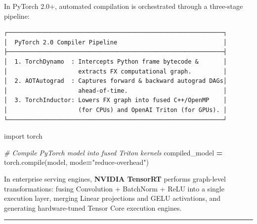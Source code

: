 \documentclass[
  letterpaper,
]{scrbook}
\newenvironment{Shaded}{\begin{snugshade}}{\end{snugshade}}
\newcommand{\BuiltInTok}[1]{#1}
\newcommand{\CommentTok}[1]{\textcolor[rgb]{0.56,0.35,0.01}{\textit{#1}}}
\newcommand{\ImportTok}[1]{#1}
\newcommand{\NormalTok}[1]{#1}
\newcommand{\OperatorTok}[1]{\textcolor[rgb]{0.81,0.36,0.00}{\textbf{#1}}}
\newcommand{\StringTok}[1]{\textcolor[rgb]{0.31,0.60,0.02}{#1}}
\begin{document}
\begin{tcolorbox}[enhanced jigsaw, arc=.35mm, bottomrule=.15mm, bottomtitle=1mm, breakable, colback=white, colbacktitle=quarto-callout-note-color!10!white, colframe=quarto-callout-note-color-frame, coltitle=black, left=2mm, leftrule=.75mm, opacityback=0, opacitybacktitle=0.6, rightrule=.15mm, title=\textcolor{quarto-callout-note-color}{\faInfo}\hspace{0.5em}{PyTorch Systems Bridge: \texttt{torch.compile}, TorchInductor, and
TensorRT}, titlerule=0mm, toprule=.15mm, toptitle=1mm]

In PyTorch 2.0+, automated compilation is orchestrated through a
three-stage pipeline:

\begin{verbatim}
┌─────────────────────────────────────────────────────────────┐
│  PyTorch 2.0 Compiler Pipeline                              │
├─────────────────────────────────────────────────────────────┤
│  1. TorchDynamo  : Intercepts Python frame bytecode &       │
│                    extracts FX computational graph.         │
│  2. AOTAutograd  : Captures forward & backward autograd DAGs│
│                    ahead-of-time.                           │
│  3. TorchInductor: Lowers FX graph into fused C++/OpenMP    │
│                    (for CPUs) and OpenAI Triton (for GPUs). │
└─────────────────────────────────────────────────────────────┘
\end{verbatim}

\begin{Shaded}
\begin{Highlighting}[]
\ImportTok{import}\NormalTok{ torch}

\CommentTok{\# Compile PyTorch model into fused Triton kernels}
\NormalTok{compiled\_model }\OperatorTok{=}\NormalTok{ torch.}\BuiltInTok{compile}\NormalTok{(model, mode}\OperatorTok{=}\StringTok{"reduce{-}overhead"}\NormalTok{)}
\end{Highlighting}
\end{Shaded}

In enterprise serving engines, \textbf{NVIDIA TensorRT} performs
graph-level transformations: fusing Convolution + BatchNorm + ReLU into
a single execution layer, merging Linear projections and GELU
activations, and generating hardware-tuned Tensor Core execution
engines.

\end{tcolorbox}

\begin{center}\rule{0.5\linewidth}{0.5pt}\end{center}
\end{document}
